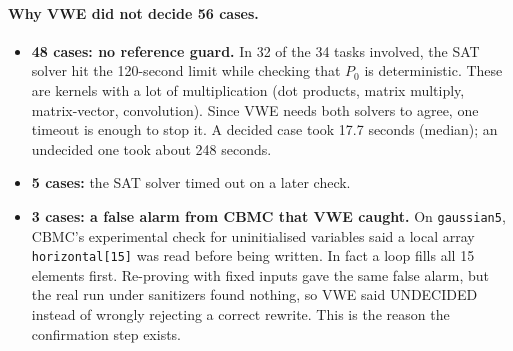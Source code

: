 \documentclass[10pt,a4paper]{article}
\newcommand{\Pz}{P_0}\newcommand{\Po}{P_1}
\begin{document}
\paragraph{Why VWE did not decide 56 cases.}
\begin{itemize}
\item \textbf{48 cases: no reference guard.} In 32 of the 34 tasks involved, the SAT solver hit the
120-second limit while checking that $\Pz$ is deterministic. These are kernels with a lot of
multiplication (dot products, matrix multiply, matrix-vector, convolution). Since VWE needs both
solvers to agree, one timeout is enough to stop it. A decided case took 17.7 seconds (median); an
undecided one took about 248 seconds.
\item \textbf{5 cases:} the SAT solver timed out on a later check.
\item \textbf{3 cases: a false alarm from CBMC that VWE caught.} On \texttt{gaussian5}, CBMC's
experimental check for uninitialised variables said a local array \texttt{horizontal[15]} was read
before being written. In fact a loop fills all 15 elements first. Re-proving with fixed inputs gave
the same false alarm, but the real run under sanitizers found nothing, so VWE said UNDECIDED
instead of wrongly rejecting a correct rewrite. This is the reason the confirmation step exists.
\end{itemize}
\end{document}
